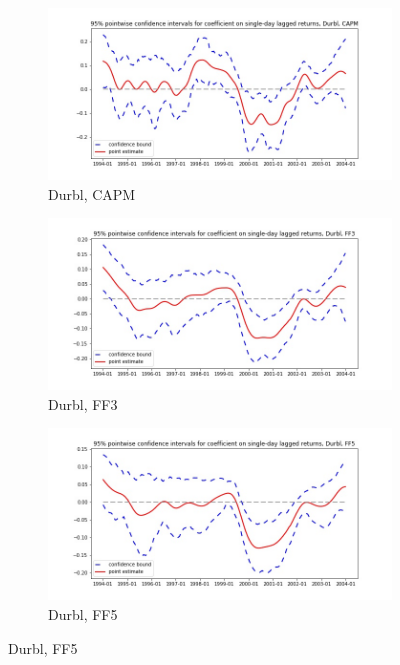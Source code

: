 \documentclass{article}
\begin{document}
\begin{figure}
\centering
  \begin{subfigure}[b]{0.3\textwidth}
    \includegraphics[width=\textwidth]{Durbl/pointwiseCIs_CAPM.jpg}
    \caption{Durbl, CAPM}
    \label{fig:1}
  \end{subfigure}
  \begin{subfigure}[b]{0.3\textwidth}
    \includegraphics[width=\textwidth]{Durbl/pointwiseCIs_FF3.jpg}
    \caption{Durbl, FF3}
    \label{fig:2}
  \end{subfigure}
   \begin{subfigure}[b]{0.3\textwidth}
    \includegraphics[width=\textwidth]{Durbl/pointwiseCIs_FF5.jpg}
    \caption{Durbl, FF5}
    \label{fig:2}
  \end{subfigure}
  \end{figure}
  
\end{document}
